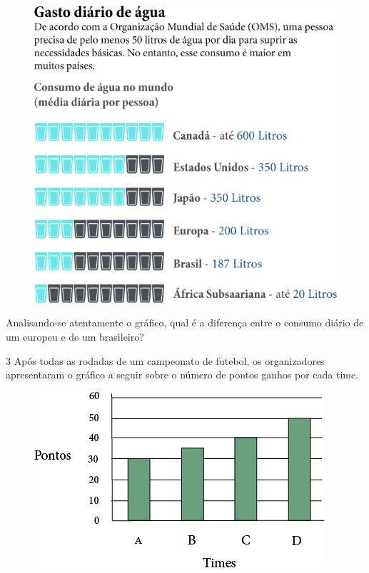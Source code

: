 \begin{figure}[htpb!]
\centering
\includegraphics[width=.9\textwidth]{media/image42.png}
\end{figure}

\pagebreak
Analisando-se atentamente o gráfico, qual é a diferença entre o
consumo diário de um europeu e de um brasileiro?

\begin{mdframed}[linewidth=2pt,linecolor=salmao,roundcorner=2pt]
\vspace{2cm}
\end{mdframed}

\num{3} Após todas as rodadas de um campeonato de futebol, os organizadores
apresentaram o gráfico a seguir sobre o número de pontos ganhos por cada
time.

\begin{figure}[htpb!]
\centering
\includegraphics[width=.9\textwidth]{media/image43.png}
\end{figure}


